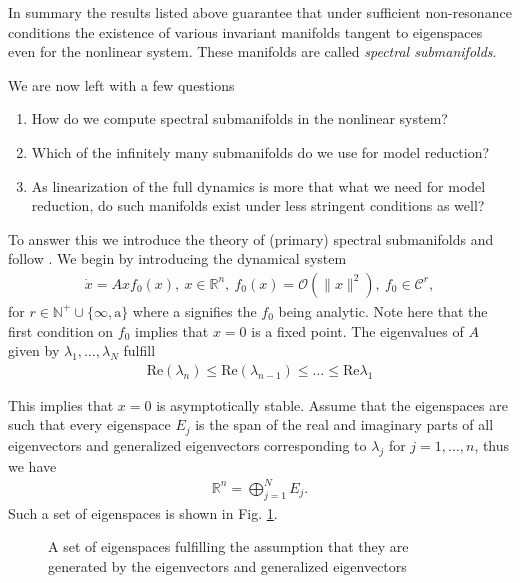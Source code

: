 In summary the results listed above guarantee that under sufficient non-resonance conditions the existence of various invariant manifolds tangent to eigenspaces even for the nonlinear system. These manifolds are called \emph{spectral submanifolds}.

We are now left with a few questions
\begin{enumerate}
	\item How do we compute spectral submanifolds in the nonlinear system?
	\item Which of the infinitely many submanifolds do we use for model reduction?
	\item As linearization of the full dynamics is more that what we need for model reduction, do such manifolds exist under less stringent conditions as well?
\end{enumerate}

To answer this we introduce the theory of (primary) spectral submanifolds and follow \cite{Ponsioen2016}. We begin by introducing the dynamical system
\begin{align}
	\dot{x} = Ax f_0(x),\ x \in \mathbb{R}^{n},\ f_{0}(x)=\mathcal{O}\left(\|x\|^2\right),\ f_0 \in \mathcal{C}^{r},
\end{align}
for $r \in \mathbb{N}^{+}\cup\{\infty , \textrm{a} \}$ where a signifies the $f_0$ being analytic. Note here that the first condition on $f_0$ implies that $x=0$ is a fixed point. The eigenvalues of $A$ given by $\lambda_1,\ldots,\lambda_N$ fulfill
\begin{align}
	\textrm{Re} (\lambda_n) \leq  \textrm{Re} (\lambda_{n-1}) \leq \ldots \leq  \textrm{Re} \lambda_1 	
\end{align}

This implies that $x=0$ is asymptotically stable. Assume that the eigenspaces are such that every eigenspace $E_j$ is the span of the real and imaginary parts of all eigenvectors and generalized eigenvectors corresponding to $\lambda_j$ for $j=1,\ldots,n$, thus we have
\begin{align}
\mathbb{R}^{n} = \bigoplus_{j=1}^{N}E_j	.
\end{align}
Such a set of eigenspaces is shown in Fig. \ref{fig:ponsioen_eigenspaces}.
\begin{figure}[h!]
	\centering
	\caption{A set of eigenspaces fulfilling the assumption that they are generated by the eigenvectors and generalized eigenvectors}
	\label{fig:ponsioen_eigenspaces}
\end{figure}

